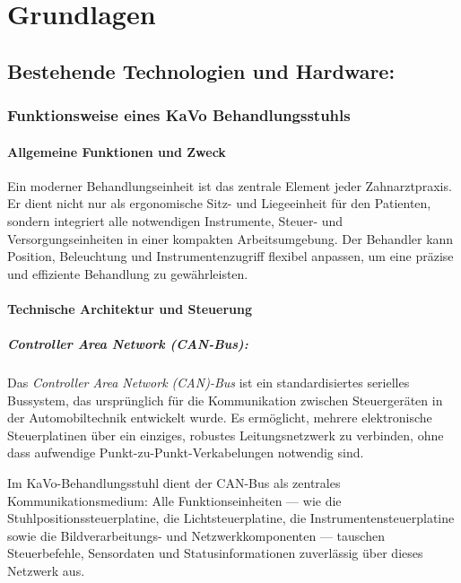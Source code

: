 \chapter{Grundlagen}

\section{Bestehende Technologien und Hardware:}

\subsection{Funktionsweise eines KaVo Behandlungsstuhls}

\subsubsection{Allgemeine Funktionen und Zweck}

Ein moderner Behandlungseinheit ist das zentrale Element jeder Zahnarztpraxis. Er dient nicht nur als ergonomische Sitz- und Liegeeinheit für den Patienten, sondern integriert alle notwendigen Instrumente, Steuer- und Versorgungseinheiten in einer kompakten Arbeitsumgebung. Der Behandler kann Position, Beleuchtung und Instrumentenzugriff flexibel anpassen, um eine präzise und effiziente Behandlung zu gewährleisten.


\subsubsection{Technische Architektur und Steuerung}

\paragraph{Controller Area Network (CAN-Bus):}

\leavevmode

Das \textit{Controller Area Network (CAN)-Bus} ist ein standardisiertes serielles Bussystem, das ursprünglich für die Kommunikation zwischen Steuergeräten in der Automobiltechnik entwickelt wurde. Es ermöglicht, mehrere elektronische Steuerplatinen über ein einziges, robustes Leitungsnetzwerk zu verbinden, ohne dass aufwendige Punkt-zu-Punkt-Verkabelungen notwendig sind.

Im KaVo-Behandlungsstuhl dient der CAN-Bus als zentrales Kommunikationsmedium: Alle Funktionseinheiten — wie die Stuhlpositionssteuerplatine, die Lichtsteuerplatine, die Instrumentensteuerplatine sowie die Bildverarbeitungs- und Netzwerkkomponenten — tauschen Steuerbefehle, Sensordaten und Statusinformationen zuverlässig über dieses Netzwerk aus.

